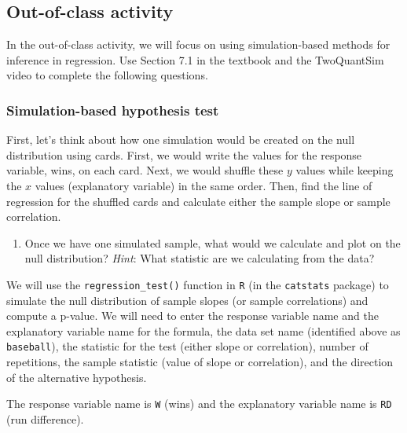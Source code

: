 \documentclass[
]{report}
\providecommand{\tightlist}{%
  \setlength{\itemsep}{0pt}\setlength{\parskip}{0pt}}
\begin{document}
\vspace{1in}

\hypertarget{out-of-class-activity-1}{%
\subsection{Out-of-class activity}\label{out-of-class-activity-1}}

In the out-of-class activity, we will focus on using simulation-based methods for inference in regression. Use Section 7.1 in the textbook and the TwoQuantSim video to complete the following questions.

\hypertarget{simulation-based-hypothesis-test}{%
\subsubsection*{Simulation-based hypothesis test}\label{simulation-based-hypothesis-test}}

First, let's think about how one simulation would be created on the null distribution using cards. First, we would write the values for the response variable, wins, on each card. Next, we would shuffle these \(y\) values while keeping the \(x\) values (explanatory variable) in the same order. Then, find the line of regression for the shuffled cards and calculate either the sample slope or sample correlation.

\begin{enumerate}
\def\labelenumi{\arabic{enumi}.}
\tightlist
\item
  Once we have one simulated sample, what would we calculate and plot on the null distribution? \emph{Hint}: What statistic are we calculating from the data?
\end{enumerate}

\vspace{1in}

We will use the \texttt{regression\_test()} function in \texttt{R} (in the \texttt{catstats} package) to simulate the null distribution of sample slopes (or sample correlations) and compute a p-value. We will need to enter the response variable name and the explanatory variable name for the formula, the data set name (identified above as \texttt{baseball}), the statistic for the test (either slope or correlation), number of repetitions, the sample statistic (value of slope or correlation), and the direction of the alternative hypothesis.

The response variable name is \texttt{W} (wins) and the explanatory variable name is \texttt{RD} (run difference).
\end{document}
